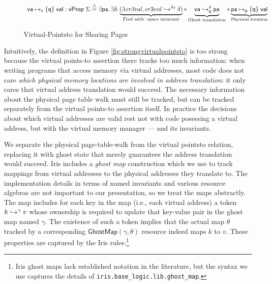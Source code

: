 \newcommand{\vale}{\textsf{val}}
\begin{figure*}
\footnotesize
\[
\begin{array}{l}
    \vaddr\mapsto_{\textsf{v}}\{\textsf{q}\}\;\vale : \mathsf{vProp}~\Sigma \stackrel{\triangle}{=} 
    \exists \paddr\ldotp
    \exists \delta\ldotp
    \underbrace{(\lambda\mathit{cr3val}\ldotp\ghostmaptoken{\delta{}s}{cr3val}{\delta})}_\text{Find addr.\;space invariant} \ast 
  \underbrace{\fracghostmaptoken{\delta}{\mathsf{va}}{\mathsf{pa}}{\mathsf{q}} }_\text{Ghost translation}\ast 
  \underbrace{\paddr \mapsto_{\mathsf{p}}\{\textsf{q}\}\; \vale}_\text{Physical location}
\end{array}
\]
\vspace{-1em}
\caption{Virtual-Pointsto for Sharing Pages}
  \label{fig:virtualpointstosharing}
\end{figure*}  

  Intuitively, the definition in Figure \ref{fig:strongvirtualpointsto} is too strong because the virtual points-to
  assertion there tracks too much information: when writing programs that access memory via virtual addresses,
  most code does not care \emph{which physical memory locations are involved in address translation}: it only cares
  that virtual address translation would succeed. The necessary information about the physical page table walk
  must still be tracked, but can be tracked separately from the virtual points-to assertion itself.
  In practice the decisions about which virtual addresses are valid rest not with code posessing a virtual address, but with
  the virtual memory manager --- and its invariants.

  We separate the physical page-table-walk  
  from the virtual pointsto relation, replacing it with ghost state that merely guarantees the address translation would succeed.
  Iris includes a \emph{ghost map} construction which we use to track mappings from
  virtual addresses to the physical addresses they translate to.
  The implementation details in terms of named invariants and various resource algebras are not important to our presentation, so
  we treat the maps abstractly.
   The map includes for each key in the map (i.e.,
  each virtual address) a token $k\hookrightarrow^{\gamma}v$ whose ownership is required to update that key-value pair in the ghost map
  named $\gamma$. The existence of such a token implies that the actual map $\theta$ tracked by a corresponding $\mathsf{GhostMap}(\gamma,\theta)$
  resource indeed maps $k$ to $v$. These properties are captured by the Iris rules:\footnote{Iris ghost maps lack established notation in the literature,
  but the syntax we use captures the details of \texttt{iris.base\_logic.lib.ghost\_map}.}

